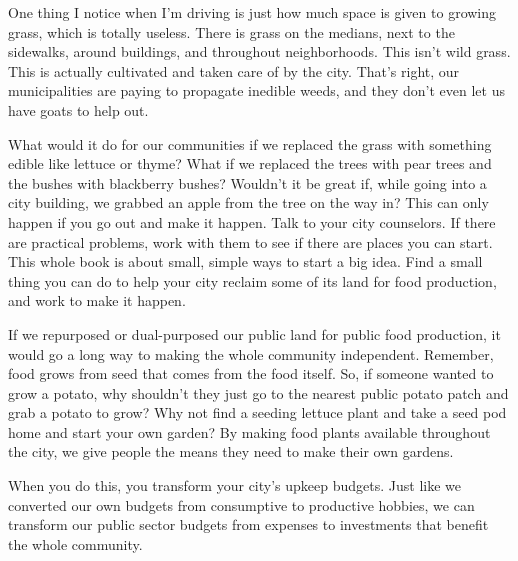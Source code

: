 \begin{policynote}
One thing I notice when I’m driving is just how much space is given to
growing grass, which is totally useless. There is grass on the medians,
next to the sidewalks, around buildings, and throughout neighborhoods.
This isn’t wild grass. This is actually cultivated and taken care of by
the city. That’s right, our municipalities are paying to propagate
inedible weeds, and they don’t even let us have goats to help out.

What would it do for our communities if we replaced the grass with
something edible like lettuce or thyme?  What if we replaced the trees
with pear trees and the bushes with blackberry bushes?  Wouldn’t it be
great if, while going into a city building, we grabbed an apple from
the tree on the way in?  This can only happen if you go out and make it
happen. Talk to your city counselors. If there are practical problems,
work with them to see if there are places you can start. This whole
book is about small, simple ways to start a big idea. Find a small
thing you can do to help your city reclaim some of its land for food
production, and work to make it happen.

If we repurposed or dual-purposed our public land for public food
production, it would go a long way to making the whole community
independent. Remember, food grows from seed that comes from the food
itself. So, if someone wanted to grow a potato, why shouldn’t they just
go to the nearest public potato patch and grab a potato to grow?  Why
not find a seeding lettuce plant and take a seed pod home and start
your own garden?  By making food plants available throughout the city,
we give people the means they need to make their own gardens.

When you do this, you transform your city’s upkeep budgets. Just like we
converted our own budgets from consumptive to productive hobbies, we
can transform our public sector budgets from expenses to investments
that benefit the whole community.
\end{policynote}

